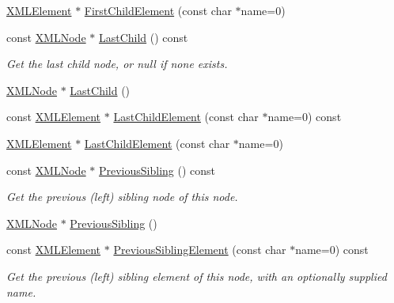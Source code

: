 \begin{DoxyCompactItemize}
\item 
\mbox{\hyperlink{classtinyxml2_1_1_x_m_l_element}{X\+M\+L\+Element}} $\ast$ \mbox{\hyperlink{classtinyxml2_1_1_x_m_l_node_af1e0e475cc27d5e7eeaf4d732691b741}{First\+Child\+Element}} (const char $\ast$name=0)
\item 
const \mbox{\hyperlink{classtinyxml2_1_1_x_m_l_node}{X\+M\+L\+Node}} $\ast$ \mbox{\hyperlink{classtinyxml2_1_1_x_m_l_node_a9b8583a277e8e26f4cbbb5492786778e}{Last\+Child}} () const
\begin{DoxyCompactList}\small\item\em Get the last child node, or null if none exists. \end{DoxyCompactList}\item 
\mbox{\hyperlink{classtinyxml2_1_1_x_m_l_node}{X\+M\+L\+Node}} $\ast$ \mbox{\hyperlink{classtinyxml2_1_1_x_m_l_node_ad7552c8cb1dc0cb6f3bdc14a9d115dbf}{Last\+Child}} ()
\item 
const \mbox{\hyperlink{classtinyxml2_1_1_x_m_l_element}{X\+M\+L\+Element}} $\ast$ \mbox{\hyperlink{classtinyxml2_1_1_x_m_l_node_a609e02f02044f39b928d1a3e0de9f532}{Last\+Child\+Element}} (const char $\ast$name=0) const
\item 
\mbox{\hyperlink{classtinyxml2_1_1_x_m_l_element}{X\+M\+L\+Element}} $\ast$ \mbox{\hyperlink{classtinyxml2_1_1_x_m_l_node_a1b77a8194d059665a4412ebfea276878}{Last\+Child\+Element}} (const char $\ast$name=0)
\item 
const \mbox{\hyperlink{classtinyxml2_1_1_x_m_l_node}{X\+M\+L\+Node}} $\ast$ \mbox{\hyperlink{classtinyxml2_1_1_x_m_l_node_aac667c513d445f8b783e1e15ef9d3551}{Previous\+Sibling}} () const
\begin{DoxyCompactList}\small\item\em Get the previous (left) sibling node of this node. \end{DoxyCompactList}\item 
\mbox{\hyperlink{classtinyxml2_1_1_x_m_l_node}{X\+M\+L\+Node}} $\ast$ \mbox{\hyperlink{classtinyxml2_1_1_x_m_l_node_ae760e5e7e766df1d2cf3bb4a847876d6}{Previous\+Sibling}} ()
\item 
const \mbox{\hyperlink{classtinyxml2_1_1_x_m_l_element}{X\+M\+L\+Element}} $\ast$ \mbox{\hyperlink{classtinyxml2_1_1_x_m_l_node_a9453cda5e970375a7b1b2099f8a7c40a}{Previous\+Sibling\+Element}} (const char $\ast$name=0) const
\begin{DoxyCompactList}\small\item\em Get the previous (left) sibling element of this node, with an optionally supplied name. \end{DoxyCompactList}\item 

\end{DoxyCompactItemize}
